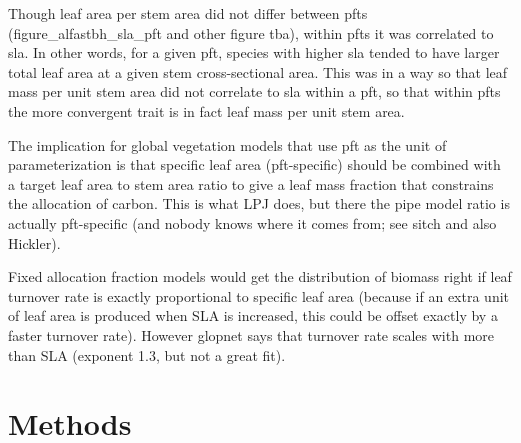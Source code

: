 \documentclass[a4paper]{article}
\begin{document}
Though leaf area per stem area did not differ between pfts (figure\_alfastbh\_sla\_pft and other figure tba), within pfts it was correlated to sla. In other words, for a given pft, species with higher sla tended to have larger total leaf area at a given stem cross-sectional area. This was in a way so that leaf mass per unit stem area did not correlate to sla within a pft, so that within pfts the more convergent trait is in fact leaf mass per unit stem area.

The implication for global vegetation models that use pft as the unit of parameterization is that specific leaf area (pft-specific) should be combined with a target leaf area to stem area ratio to give a leaf mass fraction that constrains the allocation of carbon. This is what LPJ does, but there the pipe model ratio is actually pft-specific (and nobody knows where it comes from; see sitch and also Hickler).

Fixed allocation fraction models would get the distribution of biomass right if leaf turnover rate is exactly proportional to specific leaf area (because if an extra unit of leaf area is produced when SLA is increased, this could be offset exactly by a faster turnover rate). However glopnet says that turnover rate scales with more than SLA (exponent 1.3, but not a great fit). 



















\section{Methods}
\end{document}
